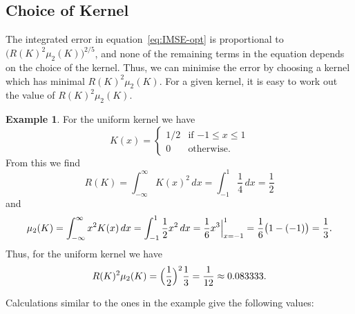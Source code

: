 \documentclass[
  a4paper,
]{article}
\theoremstyle{definition}
\theoremstyle{definition}
\newtheorem{example}{Example}[section]
\theoremstyle{definition}
\theoremstyle{definition}
\theoremstyle{remark}
\begin{document}
\hypertarget{choice-of-kernel}{%
\subsection{Choice of Kernel}\label{choice-of-kernel}}

The integrated error in equation~\eqref{eq:IMSE-opt} is proportional to
\(\bigl( R(K)^2 \mu_2(K) \bigr)^{2/5}\), and none of the remaining terms in
the equation depends on the choice of the kernel. Thus, we can minimise
the error by choosing a kernel which has minimal \(R(K)^2 \mu_2(K)\).
For a given kernel, it is easy to work out the value of \(R(K)^2 \mu_2(K)\).

\begin{example}
For the uniform kernel we have
\begin{equation*}
  K(x)
  = \begin{cases}
      1/2 & \mbox{if $-1 \leq x \leq 1$} \\
      0 & \mbox{otherwise.}
    \end{cases}
\end{equation*}
From this we find
\begin{equation*}
  R(K)
  = \int_{-\infty}^\infty K(x)^2 \,dx
  = \int_{-1}^1 \frac14 \,dx
  = \frac12
\end{equation*}
and
\begin{equation*}
  \mu_2(K)
  = \int_{-\infty}^\infty x^2 K(x) \,dx
  = \int_{-1}^1 \frac12 x^2 \,dx
  = \frac16 \Bigl. x^3 \Bigr|_{x=-1}^1
  = \frac16 \bigl( 1 - (-1) \bigr)
  = \frac13.
\end{equation*}
Thus, for the uniform kernel we have
\begin{equation*}
  R(K)^2 \mu_2(K)
  = \Bigl( \frac12 \Bigr)^2 \frac13
  = \frac{1}{12}
  \approx 0.083333.
\end{equation*}
\end{example}

Calculations similar to the ones in the example give the following
values:
\end{document}
